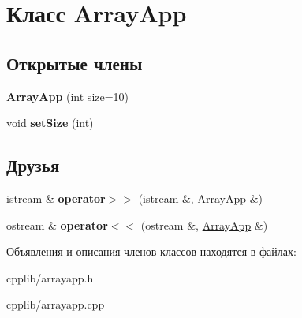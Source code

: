 \hypertarget{classArrayApp}{}\section{Класс Array\+App}
\label{classArrayApp}
\subsection*{Открытые члены}
\begin{DoxyCompactItemize}
\item 
\hypertarget{classArrayApp_a1eae643d61e71875d7b0a6d1ee2ea371}{}{\bfseries Array\+App} (int size=10)\label{classArrayApp_a1eae643d61e71875d7b0a6d1ee2ea371}

\item 
\hypertarget{classArrayApp_a2e6d6898b049613a35c78023bc211766}{}void {\bfseries set\+Size} (int)\label{classArrayApp_a2e6d6898b049613a35c78023bc211766}

\end{DoxyCompactItemize}
\subsection*{Друзья}
\begin{DoxyCompactItemize}
\item 
\hypertarget{classArrayApp_a15c040991ae8d589f065099b98680ac3}{}istream \& {\bfseries operator$>$$>$} (istream \&, \hyperlink{classArrayApp}{Array\+App} \&)\label{classArrayApp_a15c040991ae8d589f065099b98680ac3}

\item 
\hypertarget{classArrayApp_add2c61c36253f6c9085ecc15e9d6425a}{}ostream \& {\bfseries operator$<$$<$} (ostream \&, \hyperlink{classArrayApp}{Array\+App} \&)\label{classArrayApp_add2c61c36253f6c9085ecc15e9d6425a}

\end{DoxyCompactItemize}


Объявления и описания членов классов находятся в файлах\+:\begin{DoxyCompactItemize}
\item 
cpplib/arrayapp.\+h\item 
cpplib/arrayapp.\+cpp\end{DoxyCompactItemize}
